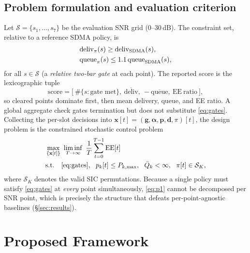 \documentclass[journal]{IEEEtran}
\newcommand{\vect}[1]{\mathbf{#1}}
\begin{document}
\subsection{Problem formulation and evaluation criterion}
Let $\mathcal{S}=\{s_1,\dots,s_7\}$ be the evaluation SNR grid (0--30\,dB). The
constraint set, relative to a reference SDMA policy, is
\begin{equation}
\begin{split}
&\mathrm{deliv}_\pi(s) \ge \mathrm{deliv}_{\rm SDMA}(s),\\
&\mathrm{queue}_\pi(s) \le 1.1\,\mathrm{queue}_{\rm SDMA}(s),
\end{split}
\label{eq:gates}
\end{equation}
for all $s\in\mathcal{S}$ (a \emph{relative two-bar gate} at each point). The
reported score is the lexicographic tuple
\begin{equation}
\mathrm{score} = \big[\ \#\{s:\text{gate met}\},\ \overline{\mathrm{deliv}},\ -\overline{\mathrm{queue}},\ \mathrm{EE\ ratio}\ \big],
\label{eq:score}
\end{equation}
so cleared points dominate first, then mean delivery, queue, and EE ratio. A
global aggregate check gates termination but does not substitute
\eqref{eq:gates}. Collecting the per-slot decisions into
$\vect{x}[t]=(\vect{g},\vect{\alpha},\vect{p},\vect{d},\pi)[t]$, the design
problem is the constrained stochastic control problem
\begin{equation}
\begin{split}
&\max_{\{\vect{x}[t]\}}\ \liminf_{T\to\infty}\ \frac{1}{T}\sum_{t=0}^{T-1}\mathrm{EE}[t]\\
&\text{s.t.}\quad \eqref{eq:gates},\ \ p_k[t]\le P_{k,\max},\ \ \bar{Q}_k<\infty,\ \ \pi[t]\in\mathcal{S}_K,
\end{split}
\label{eq:p1}
\end{equation}
where $\mathcal{S}_K$ denotes the valid SIC permutations. Because a single
policy must satisfy \eqref{eq:gates} at \emph{every} point simultaneously,
\eqref{eq:p1} cannot be decomposed per SNR point, which is precisely the
structure that defeats per-point-agnostic baselines (\S\ref{sec:results}).

\section{Proposed Framework}
\label{sec:method}
\end{document}
